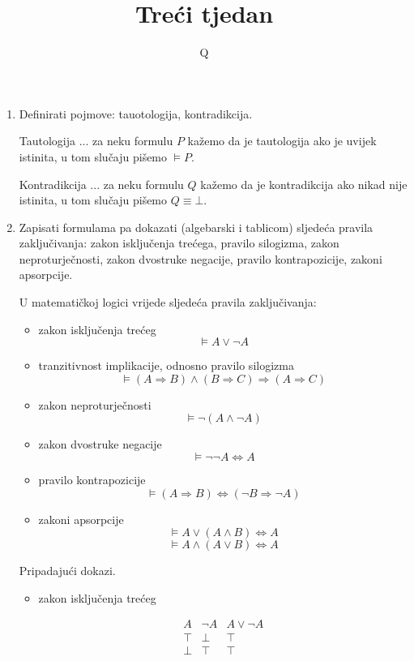 \documentclass{article}
\title{\textbf{Treći tjedan}}
\author{Q}
\date{}
\begin{document}
\pagecolor{black}
\color{white}
\maketitle

\begin{enumerate}

\item Definirati pojmove: tauotologija, kontradikcija.

Tautologija ... za neku formulu $P$ kažemo da je tautologija ako je uvijek istinita, u tom slučaju pišemo $\vDash P$.

Kontradikcija ... za neku formulu $Q$ kažemo da je kontradikcija ako nikad nije istinita, u tom slučaju pišemo $Q\equiv\bot$.

\item Zapisati formulama pa dokazati (algebarski i tablicom) sljedeća pravila zaključivanja: zakon isključenja trećega, pravilo silogizma, zakon neproturječnosti, zakon dvostruke negacije, pravilo kontrapozicije, zakoni apsorpcije.

U matematičkoj logici vrijede sljedeća pravila zaključivanja:
\begin{itemize}
\item zakon isključenja trećeg
$$\vDash A\lor\neg A$$
\item tranzitivnost implikacije, odnosno pravilo silogizma
$$\vDash ( A\Rightarrow B)\land(B\Rightarrow C)\Rightarrow(A\Rightarrow C)$$
\item zakon neproturječnosti
$$\vDash \neg( A\land\neg A)$$
\item zakon dvostruke negacije
$$\vDash \neg\neg A\Leftrightarrow A$$
\item pravilo kontrapozicije
$$\vDash(A\Rightarrow B)\Leftrightarrow(\neg B\Rightarrow\neg A)$$
\item zakoni apsorpcije
$$\vDash A\lor(A\land B)\Leftrightarrow A$$
$$\vDash A\land(A\lor B)\Leftrightarrow A$$
\end{itemize}

Pripadajući dokazi.

\begin{itemize}
\item zakon isključenja trećeg

\begin{displaymath}
\begin{array}{|c|c|c|}
A & \neg A & A\lor\neg A\\
\hline
\top & \bot & \top\\
\bot & \top & \top\\
\end{array}
\end{displaymath}


\end{itemize}
\end{enumerate}
\end{document}
